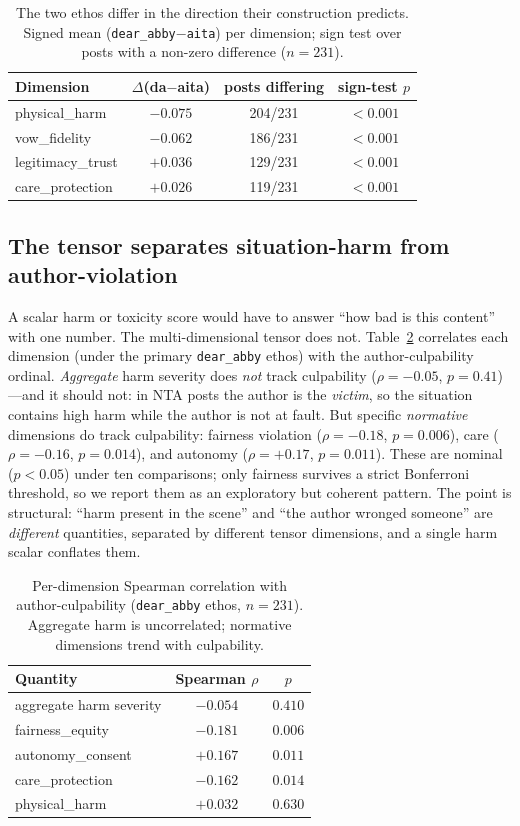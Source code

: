 \documentclass[journal]{IEEEtran}
\begin{document}
\begin{table}[!t]
\caption{The two ethos differ in the direction their construction predicts.
Signed mean (\texttt{dear\_abby}$-$\texttt{aita}) per dimension; sign test over
posts with a non-zero difference ($n{=}231$).}
\label{tab:diff}
\centering
\begin{tabular}{lccc}
\toprule
Dimension & $\Delta$(da$-$aita) & posts differing & sign-test $p$\\
\midrule
physical\_harm   & $-0.075$ & 204/231 & $<0.001$\\
vow\_fidelity    & $-0.062$ & 186/231 & $<0.001$\\
legitimacy\_trust& $+0.036$ & 129/231 & $<0.001$\\
care\_protection & $+0.026$ & 119/231 & $<0.001$\\
\bottomrule
\end{tabular}
\end{table}

\subsection{The tensor separates situation-harm from author-violation}
A scalar harm or toxicity score would have to answer ``how bad is this content''
with one number. The multi-dimensional tensor does not. Table~\ref{tab:valid}
correlates each dimension (under the primary \texttt{dear\_abby} ethos) with the
author-culpability ordinal. \emph{Aggregate} harm severity does \emph{not} track
culpability ($\rho{=}{-}0.05$, $p{=}0.41$)---and it should not: in NTA posts the
author is the \emph{victim}, so the situation contains high harm while the author
is not at fault. But specific \emph{normative} dimensions do track culpability:
fairness violation ($\rho{=}{-}0.18$, $p{=}0.006$), care ($\rho{=}{-}0.16$,
$p{=}0.014$), and autonomy ($\rho{=}{+}0.17$, $p{=}0.011$). These are nominal
($p<0.05$) under ten comparisons; only fairness survives a strict Bonferroni
threshold, so we report them as an exploratory but coherent pattern. The point is
structural: ``harm present in the scene'' and ``the author wronged someone'' are
\emph{different} quantities, separated by different tensor dimensions, and a
single harm scalar conflates them.

\begin{table}[!t]
\caption{Per-dimension Spearman correlation with author-culpability
(\texttt{dear\_abby} ethos, $n{=}231$). Aggregate harm is uncorrelated;
normative dimensions trend with culpability.}
\label{tab:valid}
\centering
\begin{tabular}{lcc}
\toprule
Quantity & Spearman $\rho$ & $p$\\
\midrule
aggregate harm severity & $-0.054$ & $0.410$\\
\midrule
fairness\_equity  & $-0.181$ & $0.006$\\
autonomy\_consent & $+0.167$ & $0.011$\\
care\_protection  & $-0.162$ & $0.014$\\
physical\_harm    & $+0.032$ & $0.630$\\
\bottomrule
\end{tabular}
\end{table}
\end{document}
